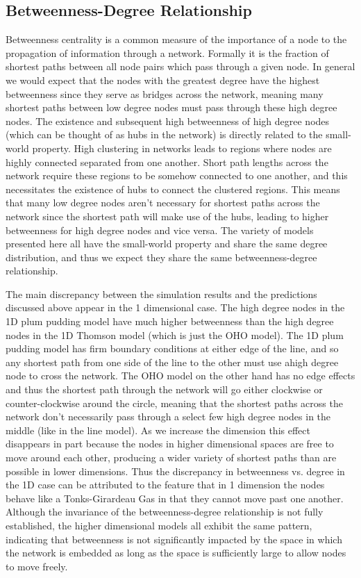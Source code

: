 \documentclass[aps,pre,reprint,superscriptaddress,amsmath,amssymb,nofootinbib]{revtex4-1}
\begin{document}
\subsection{Betweenness-Degree Relationship}	%
Betweenness centrality is a common measure of the importance of a node to the propagation of information through a network.
Formally it is the fraction of shortest paths between all node pairs which pass through a given node.
In general we would expect that the nodes with the greatest degree have the highest betweenness since they serve as bridges across the network, meaning many shortest paths between low degree nodes must pass through these high degree nodes.
The existence and subsequent high betweenness of high degree nodes (which can be thought of as hubs in the network) is directly related to the small-world property.
High clustering in networks leads to regions where nodes are highly connected separated from one another.
Short path lengths across the network require these regions to be somehow connected to one another, and this necessitates the existence of hubs to connect the clustered regions.
This means that many low degree nodes aren't necessary for shortest paths across the network since the shortest path will make use of the hubs, leading to higher betweenness for high degree nodes and vice versa.
The variety of models presented here all have the small-world property and share the same degree distribution, and thus we expect they share the same betweenness-degree relationship.


The main discrepancy between the simulation results and the predictions discussed above appear in the 1 dimensional case.
The high degree nodes in the 1D plum pudding model have much higher betweenness than the high degree nodes in the 1D Thomson model (which is just the OHO model).
The 1D plum pudding model has firm boundary conditions at either edge of the line, and so any shortest path from one side of the line to the other must use ahigh degree node to cross the network.
The OHO model on the other hand has no edge effects and thus the shortest path through the network will go either clockwise or counter-clockwise around the circle, meaning that the shortest paths across the network don't necessarily pass through a select few high degree nodes in the middle (like in the line model).
As we increase the dimension this effect disappears in part because the nodes in higher dimensional spaces are free to move around each other, producing a wider variety of shortest paths than are possible in lower dimensions. 
Thus the discrepancy in betweenness vs. degree in the 1D case can be attributed to the feature that in 1 dimension the nodes behave like a Tonks-Girardeau Gas in that they cannot move past one another.
Although the invariance of the betweenness-degree relationship is not fully established, the higher dimensional models all exhibit the same pattern, indicating that betweenness is not significantly impacted by the space in which the network is embedded as long as the space is sufficiently large to allow nodes to move freely.
\end{document}
